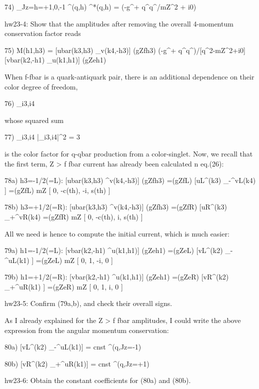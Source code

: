 \documentclass[12pt]{article}
\def\eps{\epsilon}
\begin{document}
  74) \Sum_{Jz=h=+1,0,-1} \epsilon^\mu(q,h) \epsilon^*\nu(q,h)
    = (-g^\mu\nu + q^\mu q^\nu/mZ^2 + i0)

hw23-4: Show that the amplitudes after removing the overall 4-momentum
  conservation factor reads

  75) M(h1,h3) = [ubar(k3,h3) \gamma_\mu v(k4,-h3)] (gZfh3)
                 (-g^\mu\nu + q^\mu q^\nu)/[q^2-mZ^2+i0]
                 [vbar(k2,-h1) \gamma_\nu u(k1,h1)] (gZeh1)

  When f-fbar is a quark-antiquark pair, there is an additional
  dependence on their color degree of freedom,

  76) \delta_{i3,i4}

  whose squared sum

  77) \Sum_{i3,i4} |\delta_{i3,i4}|^2 = 3

  is the color factor for q-qbar production from a color-singlet.  Now,
  we recall that the first term, Z > f fbar current has already been
  calculated n eq.(26):

  78a) h3=-1/2(=L): [ubar(k3,h3) \gamma^\mu v(k4,-h3)] (gZfh3)
                   =(gZfL) [uL^\dagger(k3) \sigma_-^\mu vL(k4) ]
                   =(gZfL) mZ [ 0, -c(th),  -i,  s(th) ]

  78b) h3=+1/2(=R): [ubar(k3,h3) \gamma^\mu v(k4,-h3)] (gZfh3)
                   =(gZfR) [uR^\dagger(k3) \sigma_+^\mu vR(k4)
                   =(gZfR) mZ [ 0, -c(th),  i,  s(th) ]

  All we need is hence to compute the initial current, which
  is much easier:

  79a) h1=-1/2(=L): [vbar(k2,-h1) \gamma^\mu u(k1,h1)] (gZeh1)
                  =(gZeL) [vL^\dagger(k2) \sigma_-^\mu uL(k1) ]
                  =(gZeL) mZ [ 0,  1,  -i,  0 ]

  79b) h1=+1/2(=R): [vbar(k2,-h1) \gamma^\mu u(k1,h1)] (gZeh1)
                  =(gZeR) [vR^\dagger(k2) \sigma_+^\mu uR(k1) ]
                  =(gZeR) mZ [ 0,  1,  i,  0 ]

hw23-5: Confirm (79a,b), and check their overall signs.

  As I already explained for the Z > f fbar amplitudes,
  I could write the above expression from the angular
  momentum conservation:

  80a) [vL^\dagger(k2) \sigma_-^\mu uL(k1)] = cnst \eps^\mu(q,Jz=-1)

  80b) [vR^\dagger(k2) \sigma_+^\mu uR(k1)] = cnst \eps^\mu(q,Jz=+1)

hw23-6: Obtain the constant coefficients for (80a) and (80b).
\end{document}
